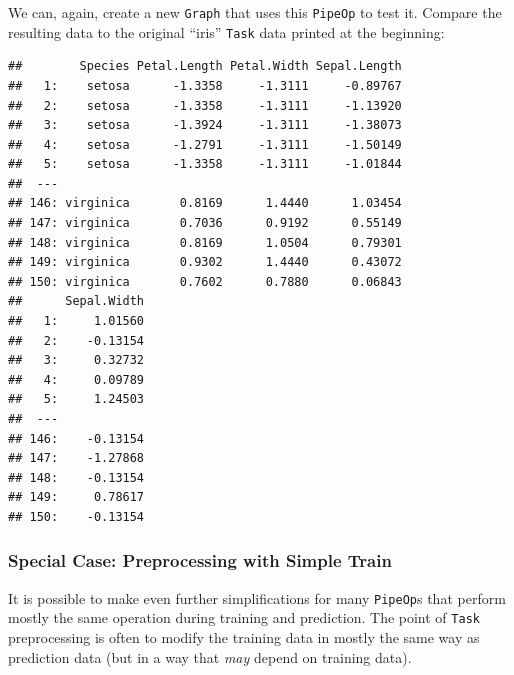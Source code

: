 \documentclass[]{article}
\newenvironment{Shaded}{\begin{snugshade}}{\end{snugshade}}
\newcommand{\DecValTok}[1]{\textcolor[rgb]{0.00,0.00,0.81}{#1}}
\newcommand{\KeywordTok}[1]{\textcolor[rgb]{0.13,0.29,0.53}{\textbf{#1}}}
\newcommand{\NormalTok}[1]{#1}
\newcommand{\OperatorTok}[1]{\textcolor[rgb]{0.81,0.36,0.00}{\textbf{#1}}}
\newcommand{\StringTok}[1]{\textcolor[rgb]{0.31,0.60,0.02}{#1}}
\renewenvironment{Shaded} {\begin{snugshade}\small} {\end{snugshade}}
\begin{document}
We can, again, create a new \texttt{Graph} that uses this \texttt{PipeOp} to test it.
Compare the resulting data to the original ``iris'' \texttt{Task} data printed at the beginning:

\begin{Shaded}
\end{Shaded}

\begin{verbatim}
##        Species Petal.Length Petal.Width Sepal.Length
##   1:    setosa      -1.3358     -1.3111     -0.89767
##   2:    setosa      -1.3358     -1.3111     -1.13920
##   3:    setosa      -1.3924     -1.3111     -1.38073
##   4:    setosa      -1.2791     -1.3111     -1.50149
##   5:    setosa      -1.3358     -1.3111     -1.01844
##  ---                                                
## 146: virginica       0.8169      1.4440      1.03454
## 147: virginica       0.7036      0.9192      0.55149
## 148: virginica       0.8169      1.0504      0.79301
## 149: virginica       0.9302      1.4440      0.43072
## 150: virginica       0.7602      0.7880      0.06843
##      Sepal.Width
##   1:     1.01560
##   2:    -0.13154
##   3:     0.32732
##   4:     0.09789
##   5:     1.24503
##  ---            
## 146:    -0.13154
## 147:    -1.27868
## 148:    -0.13154
## 149:     0.78617
## 150:    -0.13154
\end{verbatim}

\hypertarget{special-case-preprocessing-with-simple-train}{%
\subsubsection{Special Case: Preprocessing with Simple Train}\label{special-case-preprocessing-with-simple-train}}

It is possible to make even further simplifications for many \texttt{PipeOp}s that perform mostly the same operation during training and prediction.
The point of \texttt{Task} preprocessing is often to modify the training data in mostly the same way as prediction data (but in a way that \emph{may} depend on training data).
\end{document}
